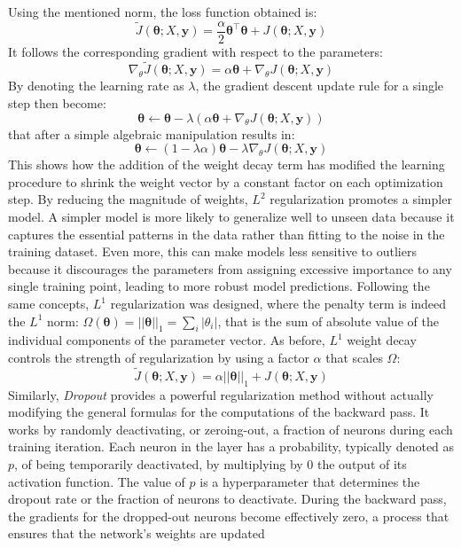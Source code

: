 \documentclass[binding=0.7cm, oneside]{sapthesis}
\begin{document}
Using the mentioned norm, the loss function obtained is:
$$\tilde{J}(\boldsymbol{\theta}; X, \boldsymbol{y}) = \frac{\alpha}{2}\boldsymbol{\theta}^\top\boldsymbol{\theta} + J(\boldsymbol{\theta}; X, \boldsymbol{y})$$
It follows the corresponding gradient with respect to the parameters:
$$\nabla_\theta\tilde{J}(\boldsymbol{\theta}; X, \boldsymbol{y}) = \alpha\boldsymbol{\theta} + \nabla_\theta J(\boldsymbol{\theta}; X, \boldsymbol{y})$$
By denoting the learning rate as $\lambda$, the gradient descent update rule for a single step then become:
$$\boldsymbol{\theta} \leftarrow \boldsymbol{\theta} - \lambda(\alpha\boldsymbol{\theta} + \nabla_\theta J(\boldsymbol{\theta}; X, \boldsymbol{y}))$$
that after a simple algebraic manipulation results in:
$$\boldsymbol{\theta} \leftarrow (1 - \lambda\alpha)\boldsymbol{\theta} - \lambda\nabla_\theta J(\boldsymbol{\theta}; X, \boldsymbol{y})$$
This shows how the addition of the weight decay term has modified the learning procedure to shrink the weight vector by a constant factor on each optimization step.
By reducing the magnitude of weights, $L^2$ regularization promotes a simpler model. A simpler model is more likely to generalize well to unseen data because it captures
the essential patterns in the data rather than fitting to the noise in the training dataset. Even more, this can make models less sensitive to outliers because it discourages
the parameters from assigning excessive importance to any single training point, leading to more robust model predictions. Following the same concepts, $L^1$ regularization
was designed, where the penalty term is indeed the $L^1$ norm: $\Omega(\boldsymbol{\theta}) = ||\boldsymbol{\theta}||_{1} = \sum_{i}|\theta_i|$, that is the sum of absolute value of
the individual components of the parameter vector. As before, $L^1$ weight decay controls the strength of regularization by using a factor $\alpha$ that scales $\Omega$:
$$\tilde{J}(\boldsymbol{\theta}; X, \boldsymbol{y}) = \alpha||\boldsymbol{\theta}||_1 + J(\boldsymbol{\theta}; X, \boldsymbol{y})$$
Similarly, \emph{Dropout} \cite{dropoput} provides a powerful regularization method without actually modifying the general formulas for the computations of the backward pass.
It works by randomly deactivating, or zeroing-out, a fraction of neurons during each training iteration. Each neuron in the layer has a probability, typically denoted as $p$,
of being temporarily deactivated, by multiplying by 0 the output of its activation function. The value of $p$ is a hyperparameter that determines the dropout rate or the fraction
of neurons to deactivate. During the backward pass, the gradients for the dropped-out neurons become effectively zero, a process that ensures that the network's weights are updated
\end{document}
